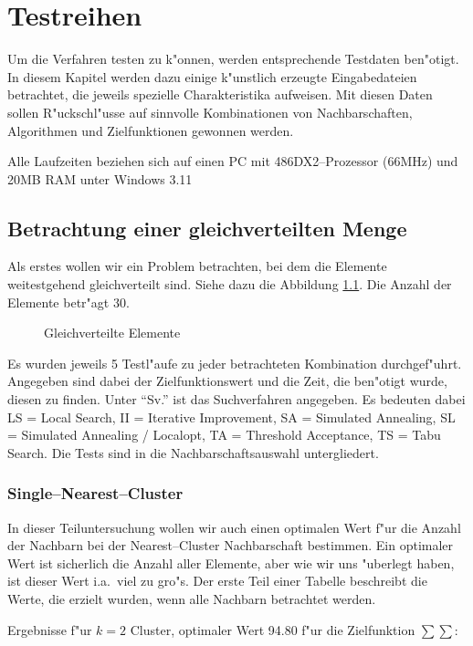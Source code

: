 \chapter{Testreihen}
\label{tests}
Um die Verfahren testen zu k"onnen, werden entsprechende Testdaten
ben"otigt. In diesem Kapitel werden dazu
einige k"unstlich erzeugte Eingabedateien betrachtet,
die jeweils spezielle Charakteristika aufweisen. Mit diesen Daten sollen
R"uckschl"usse auf sinnvolle Kombinationen von Nachbarschaften, Algorithmen 
und Zielfunktionen gewonnen werden. 

Alle Laufzeiten beziehen sich auf einen PC mit 486DX2--Prozessor (66MHz)
und 20MB RAM unter Windows 3.11

\section{Betrachtung einer gleichverteilten Menge}
Als erstes wollen wir ein Problem betrachten, bei dem die Elemente 
weitestgehend gleichverteilt sind. Siehe dazu die Abbildung 
\ref{gleichverteilt}. Die Anzahl der Elemente betr"agt 30.

\begin{figure}[htbp]
\caption{Gleichverteilte Elemente}
\label{gleichverteilt}
\end{figure}

Es wurden jeweils 5 Testl"aufe zu jeder betrachteten Kombination
durchgef"uhrt. Angegeben sind dabei der Zielfunktionswert und die Zeit,
die ben"otigt wurde, diesen zu finden.  
Unter "`Sv."' ist das Suchverfahren angegeben. Es bedeuten dabei
LS = Local Search, II = Iterative Improvement, SA = Simulated Annealing,
SL = Simulated Annealing / Localopt, TA = Threshold Acceptance, 
TS = Tabu Search.
Die Tests sind in die Nachbarschaftsauswahl untergliedert.


\subsection*{Single--Nearest--Cluster}
In dieser Teiluntersuchung wollen wir auch einen optimalen Wert
f"ur die Anzahl der Nachbarn bei der Nearest--Cluster Nachbarschaft 
bestimmen. Ein optimaler Wert ist sicherlich die Anzahl aller Elemente,
aber wie wir uns "uberlegt haben, ist dieser Wert i.a.\ viel zu gro"s.
Der erste Teil einer Tabelle beschreibt die Werte, die erzielt wurden, 
wenn alle Nachbarn betrachtet werden.

Ergebnisse f"ur $k=2$ Cluster, optimaler Wert 94.80 f"ur die Zielfunktion 
$\sum\sum$:

